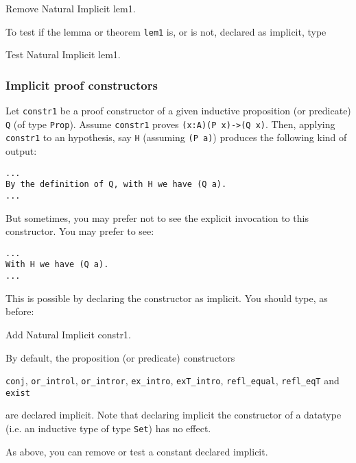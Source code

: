 \begin{coq_example*}
Remove Natural Implicit lem1.
\end{coq_example*}

To test if the lemma or theorem \verb=lem1= is, or is not,
declared as implicit, type

\begin{coq_example*}
Test Natural Implicit lem1.
\end{coq_example*}

\subsubsection*{Implicit proof constructors}

Let \verb=constr1= be a proof constructor of a given inductive
proposition (or predicate)
\verb=Q= (of type \verb=Prop=). Assume \verb=constr1= proves 
\verb=(x:A)(P x)->(Q x)=. Then, applying \verb=constr1= to an hypothesis,
say \verb=H= (assuming \verb=(P a)=) produces the following kind of output:

\begin{verbatim}
...
By the definition of Q, with H we have (Q a).
...
\end{verbatim}

But sometimes, you may prefer not to see the explicit invocation to
this constructor. You may prefer to see:

\begin{verbatim}
...
With H we have (Q a).
...
\end{verbatim}

This is possible by declaring the constructor as implicit. You should
type, as before:

\begin{coq_example*}
Add Natural Implicit constr1.
\end{coq_example*}

By default, the proposition (or predicate) constructors

\verb=conj=, \verb=or_introl=, \verb=or_intror=, \verb=ex_intro=,
\verb=exT_intro=, \verb=refl_equal=, \verb=refl_eqT= and \verb=exist=

\noindent are declared implicit. Note that declaring implicit the
constructor of a datatype (i.e. an inductive type of type \verb=Set=)
has no effect.

As above, you can remove or test a constant declared implicit.

